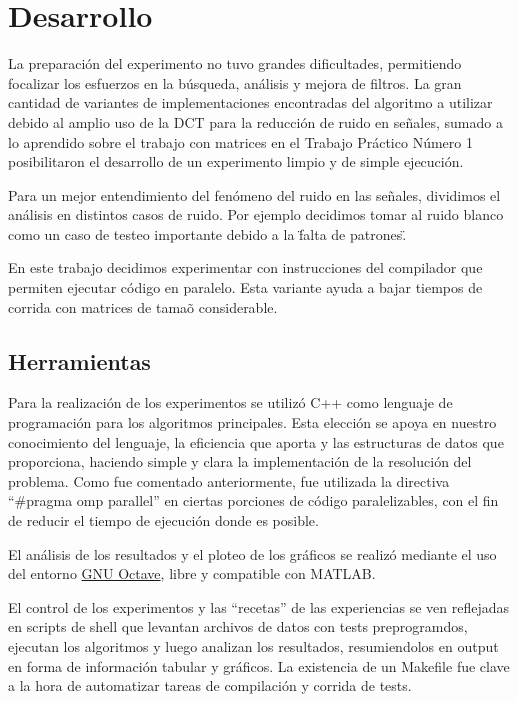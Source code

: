 
\section{Desarrollo}

La preparaci\'on del experimento no tuvo grandes dificultades, permitiendo
focalizar los esfuerzos en la b\'usqueda, an\'alisis y mejora de filtros. 
La gran cantidad de variantes de implementaciones encontradas del algoritmo a 
utilizar debido al amplio uso de la DCT para la reducci\'on de ruido en se\~nales, 
sumado a lo aprendido sobre el trabajo con matrices en el Trabajo Pr\'actico 
N\'umero 1 posibilitaron el desarrollo de un experimento limpio y de simple 
ejecuci\'on.

Para un mejor entendimiento del fen\'omeno del ruido en las se\~nales, dividimos
el an\'alisis en distintos casos de ruido. Por ejemplo decidimos tomar al ruido
blanco como un caso de testeo importante debido a la \"falta de patrones\". 

En este trabajo decidimos experimentar con instrucciones del compilador que
permiten ejecutar c\'odigo en paralelo. Esta variante ayuda a bajar tiempos de
corrida con matrices de tama\~o considerable.

\subsection{Herramientas}

Para la realizaci\'on de los experimentos se utiliz\'o C++ como lenguaje de
programaci\'on para los algoritmos principales. Esta elecci\'on se apoya en
nuestro conocimiento del lenguaje, la eficiencia que aporta y las estructuras de
datos que proporciona, haciendo simple y clara la implementaci\'on de la
resoluci\'on del problema. Como fue comentado anteriormente, fue utilizada la
directiva ``\#pragma omp parallel'' en ciertas porciones de c\'odigo
paralelizables, con el fin de reducir el tiempo de ejecuci\'on donde es posible.

El an\'alisis de los resultados y el ploteo de los gr\'aficos se realiz\'o
mediante el uso del entorno \href{http://www.gnu.org/software/octave/}{GNU
Octave}, libre y compatible con MATLAB.

El control de los experimentos y las ``recetas'' de las experiencias se ven
reflejadas en scripts de shell que levantan archivos de datos con tests
preprogramdos, ejecutan los algoritmos y luego analizan los resultados,
resumiendolos en output en forma de informaci\'on tabular y gr\'aficos.
La existencia de un Makefile fue clave a la hora de automatizar tareas de
compilaci\'on y corrida de tests.

